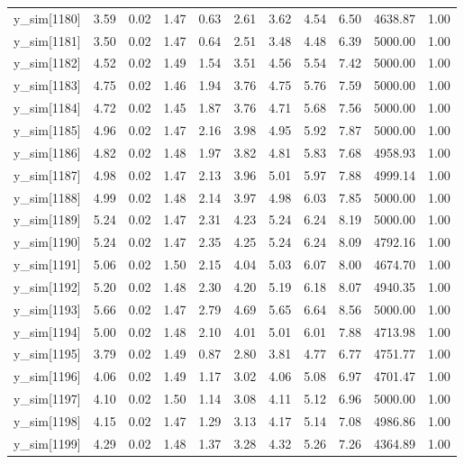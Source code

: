 \begin{table}[ht]
\begin{tabular}{rrrrrrrrrrr}
  y\_sim[1180] & 3.59 & 0.02 & 1.47 & 0.63 & 2.61 & 3.62 & 4.54 & 6.50 & 4638.87 & 1.00 \\ 
  y\_sim[1181] & 3.50 & 0.02 & 1.47 & 0.64 & 2.51 & 3.48 & 4.48 & 6.39 & 5000.00 & 1.00 \\ 
  y\_sim[1182] & 4.52 & 0.02 & 1.49 & 1.54 & 3.51 & 4.56 & 5.54 & 7.42 & 5000.00 & 1.00 \\ 
  y\_sim[1183] & 4.75 & 0.02 & 1.46 & 1.94 & 3.76 & 4.75 & 5.76 & 7.59 & 5000.00 & 1.00 \\ 
  y\_sim[1184] & 4.72 & 0.02 & 1.45 & 1.87 & 3.76 & 4.71 & 5.68 & 7.56 & 5000.00 & 1.00 \\ 
  y\_sim[1185] & 4.96 & 0.02 & 1.47 & 2.16 & 3.98 & 4.95 & 5.92 & 7.87 & 5000.00 & 1.00 \\ 
  y\_sim[1186] & 4.82 & 0.02 & 1.48 & 1.97 & 3.82 & 4.81 & 5.83 & 7.68 & 4958.93 & 1.00 \\ 
  y\_sim[1187] & 4.98 & 0.02 & 1.47 & 2.13 & 3.96 & 5.01 & 5.97 & 7.88 & 4999.14 & 1.00 \\ 
  y\_sim[1188] & 4.99 & 0.02 & 1.48 & 2.14 & 3.97 & 4.98 & 6.03 & 7.85 & 5000.00 & 1.00 \\ 
  y\_sim[1189] & 5.24 & 0.02 & 1.47 & 2.31 & 4.23 & 5.24 & 6.24 & 8.19 & 5000.00 & 1.00 \\ 
  y\_sim[1190] & 5.24 & 0.02 & 1.47 & 2.35 & 4.25 & 5.24 & 6.24 & 8.09 & 4792.16 & 1.00 \\ 
  y\_sim[1191] & 5.06 & 0.02 & 1.50 & 2.15 & 4.04 & 5.03 & 6.07 & 8.00 & 4674.70 & 1.00 \\ 
  y\_sim[1192] & 5.20 & 0.02 & 1.48 & 2.30 & 4.20 & 5.19 & 6.18 & 8.07 & 4940.35 & 1.00 \\ 
  y\_sim[1193] & 5.66 & 0.02 & 1.47 & 2.79 & 4.69 & 5.65 & 6.64 & 8.56 & 5000.00 & 1.00 \\ 
  y\_sim[1194] & 5.00 & 0.02 & 1.48 & 2.10 & 4.01 & 5.01 & 6.01 & 7.88 & 4713.98 & 1.00 \\ 
  y\_sim[1195] & 3.79 & 0.02 & 1.49 & 0.87 & 2.80 & 3.81 & 4.77 & 6.77 & 4751.77 & 1.00 \\ 
  y\_sim[1196] & 4.06 & 0.02 & 1.49 & 1.17 & 3.02 & 4.06 & 5.08 & 6.97 & 4701.47 & 1.00 \\ 
  y\_sim[1197] & 4.10 & 0.02 & 1.50 & 1.14 & 3.08 & 4.11 & 5.12 & 6.96 & 5000.00 & 1.00 \\ 
  y\_sim[1198] & 4.15 & 0.02 & 1.47 & 1.29 & 3.13 & 4.17 & 5.14 & 7.08 & 4986.86 & 1.00 \\ 
  y\_sim[1199] & 4.29 & 0.02 & 1.48 & 1.37 & 3.28 & 4.32 & 5.26 & 7.26 & 4364.89 & 1.00 \\ 

\end{tabular}
\end{table}
